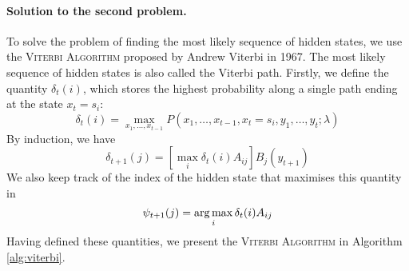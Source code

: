 	\paragraph{Solution to the second problem.} 
	To solve the problem of finding the most likely sequence of hidden states, we use the \textsc{Viterbi Algorithm} proposed by Andrew Viterbi in 1967. The most likely sequence of hidden states is also called the Viterbi path. Firstly, we define the quantity $\delta_t(i)$, which stores the highest probability along a single path ending at the state $x_t = s_i$:
	\begin{equation}
		\delta_t(i) = \max_{x_1, \dotsc, x_{t - 1}} P\left( x_1, \dotsc, x_{t - 1}, x_t = s_i, y_1, \dotsc, y_t; \lambda \right)
	\end{equation}
	By induction, we have
	\begin{equation}
		\delta_{t + 1}(j) = \left[ \max_i \delta_t(i) A_{ij} \right] B_j(y_{t + 1})
	\end{equation}
	We also keep track of the index of the hidden state that maximises this quantity in
	\begin{equation}
		\psi_{t + 1}(j) = \operatorname*{arg\,max}_i \delta_t(i) A_{ij}
	\end{equation}
	Having defined these quantities, we present the \textsc{Viterbi Algorithm} in Algorithm \ref{alg:viterbi}.
